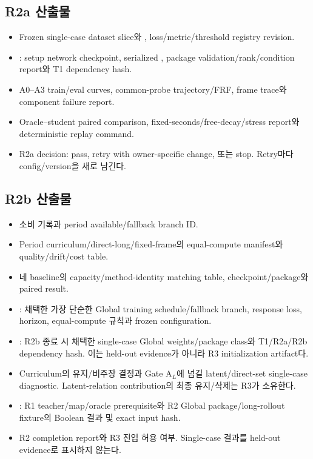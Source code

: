 \documentclass[10pt]{article}
\begin{document}
\subsection{R2a 산출물}

\begin{itemize}
  \item Frozen single-case dataset slice와 , loss/metric/threshold registry revision.
  \item {}: setup network checkpoint, serialized ,
  package validation/rank/condition report와 T1 dependency hash.
  \item A0--A3 train/eval curves, common-probe trajectory/FRF, frame trace와 component failure report.
  \item Oracle--student paired comparison, fixed-seconds/free-decay/stress report와 deterministic replay command.
  \item R2a decision: pass, retry with owner-specific change, 또는 stop. Retry마다 config/version을 새로 남긴다.
\end{itemize}

\subsection{R2b 산출물}

\begin{itemize}
  \item {} 소비 기록과 period available/fallback branch ID.
  \item Period curriculum/direct-long/fixed-frame의 equal-compute manifest와 quality/drift/cost table.
  \item 네 baseline의 capacity/method-identity matching table, checkpoint/package와 paired result.
  \item {}: 채택한 가장 단순한 Global training schedule/fallback branch,
  response loss, horizon, equal-compute 규칙과 frozen configuration.
  \item {}: R2b 종료 시 채택한 single-case Global weights/package class와
  T1/R2a/R2b dependency hash. 이는 held-out evidence가 아니라 R3 initialization artifact다.
  \item Curriculum의 유지/비주장 결정과 Gate A\(_L\)에 넘길 latent/direct-set single-case diagnostic.
  Latent-relation contribution의 최종 유지/삭제는 R3가 소유한다.
  \item {}: R1 teacher/map/oracle prerequisite와 R2 Global
  package/long-rollout fixture의 Boolean 결과 및 exact input hash.
  \item R2 completion report와 R3 진입 허용 여부. Single-case 결과를 held-out evidence로 표시하지 않는다.
\end{itemize}
\end{document}
